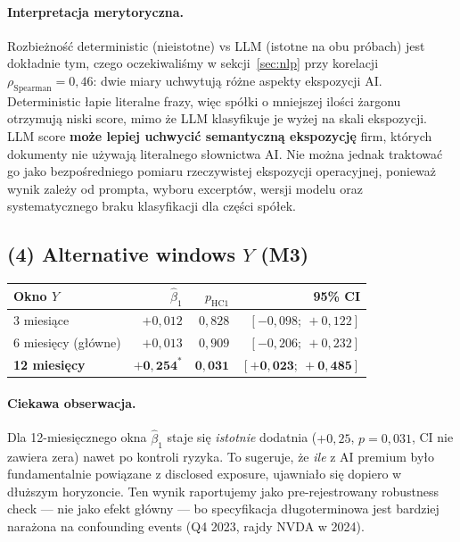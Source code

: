 \documentclass[11pt,a4paper]{article}
\begin{document}
\paragraph{Interpretacja merytoryczna.} Rozbieżność deterministic (nieistotne)
vs LLM (istotne na obu próbach) jest dokładnie tym, czego oczekiwaliśmy w
sekcji~\ref{sec:nlp} przy korelacji $\rho_{\text{Spearman}} = 0{,}46$: dwie
miary uchwytują różne aspekty ekspozycji AI. Deterministic łapie literalne
frazy, więc spółki o mniejszej ilości żargonu otrzymują niski score, mimo że
LLM klasyfikuje je wyżej na skali ekspozycji. LLM score \textbf{może lepiej
uchwycić semantyczną ekspozycję} firm, których dokumenty nie używają literalnego
słownictwa AI. Nie można jednak traktować go jako bezpośredniego pomiaru
rzeczywistej ekspozycji operacyjnej, ponieważ wynik zależy od prompta, wyboru
excerptów, wersji modelu oraz systematycznego braku klasyfikacji dla części
spółek.

\subsection{(4) Alternative windows $Y$ (M3)}
\begin{center}\small
\begin{tabular}{lrrr}
\toprule
Okno $Y$ & $\hat\beta_1$ & $p_{\text{HC1}}$ & 95\% CI \\
\midrule
3 miesiące & $+0{,}012$ & $0{,}828$ & $[-0{,}098;\ +0{,}122]$ \\
6 miesięcy (główne) & $+0{,}013$ & $0{,}909$ & $[-0{,}206;\ +0{,}232]$ \\
\textbf{12 miesięcy} & $\mathbf{+0{,}254^{*}}$ & $\mathbf{0{,}031}$ & $\mathbf{[+0{,}023;\ +0{,}485]}$ \\
\bottomrule
\end{tabular}
\end{center}

\paragraph{Ciekawa obserwacja.} Dla 12-miesięcznego okna $\hat\beta_1$ staje się
\emph{istotnie} dodatnia ($+0{,}25$, $p=0{,}031$, CI nie zawiera zera)
nawet po kontroli ryzyka. To sugeruje, że \emph{ile} z AI premium było
fundamentalnie powiązane z disclosed exposure, ujawniało się dopiero
w dłuższym horyzoncie. Ten wynik raportujemy jako pre-rejestrowany robustness check
--- nie jako efekt główny --- bo specyfikacja długoterminowa jest bardziej narażona
na confounding events (Q4 2023, rajdy NVDA w 2024).
\end{document}
